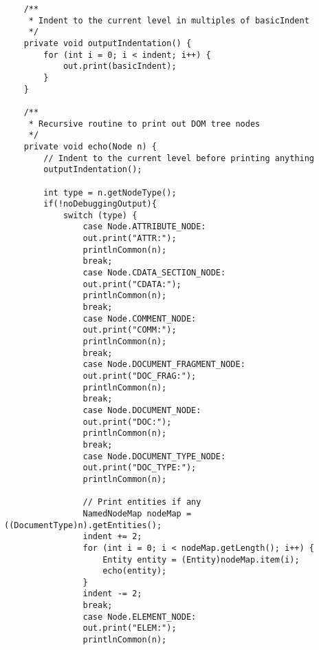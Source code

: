 \documentclass[11pt,english]{article}
\begin{document}
\begin{lstlisting}
    /**
     * Indent to the current level in multiples of basicIndent
     */
    private void outputIndentation() {
        for (int i = 0; i < indent; i++) {
            out.print(basicIndent);
        }
    }

    /**
     * Recursive routine to print out DOM tree nodes
     */
    private void echo(Node n) {
        // Indent to the current level before printing anything
        outputIndentation();

        int type = n.getNodeType();
        if(!noDebuggingOutput){
            switch (type) {
                case Node.ATTRIBUTE_NODE:
                out.print("ATTR:");
                printlnCommon(n);
                break;
                case Node.CDATA_SECTION_NODE:
                out.print("CDATA:");
                printlnCommon(n);
                break;
                case Node.COMMENT_NODE:
                out.print("COMM:");
                printlnCommon(n);
                break;
                case Node.DOCUMENT_FRAGMENT_NODE:
                out.print("DOC_FRAG:");
                printlnCommon(n);
                break;
                case Node.DOCUMENT_NODE:
                out.print("DOC:");
                printlnCommon(n);
                break;
                case Node.DOCUMENT_TYPE_NODE:
                out.print("DOC_TYPE:");
                printlnCommon(n);

                // Print entities if any
                NamedNodeMap nodeMap = ((DocumentType)n).getEntities();
                indent += 2;
                for (int i = 0; i < nodeMap.getLength(); i++) {
                    Entity entity = (Entity)nodeMap.item(i);
                    echo(entity);
                }
                indent -= 2;
                break;
                case Node.ELEMENT_NODE:
                out.print("ELEM:");
                printlnCommon(n);


\end{lstlisting}
\end{document}
